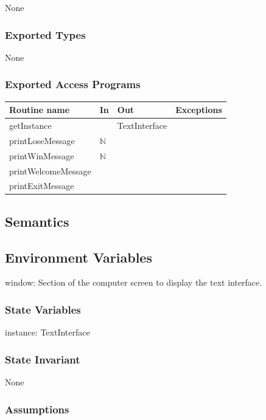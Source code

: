 \documentclass[12pt]{article}
\begin{document}
None

\subsubsection* {Exported Types}

None

\medskip

\subsubsection* {Exported Access Programs}

\begin{tabular}{| l | l | l | p{6cm} |}
\hline
\textbf{Routine name} & \textbf{In} & \textbf{Out} & \textbf{Exceptions}\\
\hline
getInstance & ~ & TextInterface &  \\
\hline
printLoseMessage & $\mathbb{N}$ & ~ & \\
\hline
printWinMessage & $\mathbb{N}$ & ~ & \\
\hline
printWelcomeMessage & ~ & ~ & \\
\hline
printExitMessage & ~ & ~ & \\
\hline
\end{tabular}

\subsection* {Semantics}

\subsection*{Environment Variables}

window: Section of the computer screen to display the text interface.

\subsubsection* {State Variables}

instance: TextInterface

\subsubsection* {State Invariant}

None

\subsubsection* {Assumptions}
\end{document}
